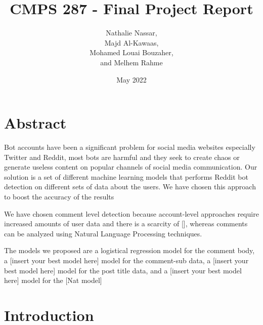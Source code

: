 \documentclass{article}
\title{CMPS 287 - Final Project Report}
\author{Nathalie Nassar, \\Majd Al-Kawaas,\\ Mohamed Louai Bouzaher,\\ and Melhem Rahme}
\date{May 2022}
\begin{document}
\maketitle

\section{Abstract}
Bot accounts have been a significant problem for social media websites especially Twitter and Reddit, most bots are harmful and they seek to create chaos or generate useless content on popular channels of social media communication. Our solution is a set of different machine learning models that performs Reddit bot detection 
on different sets of data about the users. We have chosen this approach to boost the accuracy of the results

We have chosen comment level detection because account-level approaches require increased amounts of user data and there is a scarcity of [], whereas comments can be analyzed using Natural Language Processing techniques.

The models we proposed are a logistical regression model for the comment body, a [insert your best model here] model for the comment-sub data, a [insert your best model here] model for the post title data, and a [insert your best model here] model for the [Nat model]

\section{Introduction}
\end{document}
